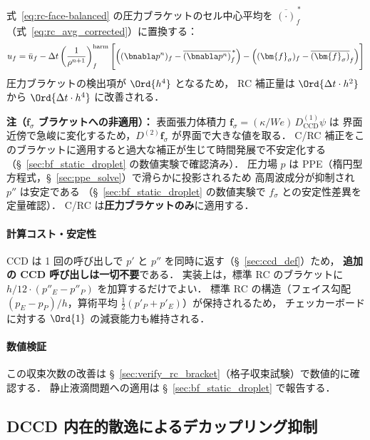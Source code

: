 式~\eqref{eq:rc-face-balanced} の圧力ブラケットのセル中心平均を
$\overline{(\cdot)}_f^{\,*}$（式~\eqref{eq:rc_avg_corrected}）に置換する：
\begin{equation}
  u_f = \bar{u}_f
    - \Delta t\left(\frac{1}{\rho^{n+1}}\right)_f^{\mathrm{harm}}
    \Biggl[
      \Bigl((\bnabla p^n)_f - \overline{(\bnabla p^n)}^{\,*}_f\Bigr)
      - \Bigl((\bm{f}_\sigma)_f - \overline{(\bm{f}_\sigma)}_f\Bigr)
    \Biggr]
  \label{eq:rc-face-balanced-ho}
\end{equation}
圧力ブラケットの検出項が $\Ord{h^4}$ となるため，
RC 補正量は $\Ord{\Delta t \cdot h^2}$ から $\Ord{\Delta t \cdot h^4}$ に改善される．

\medskip
\noindent\textbf{注（$\bm{f}_\sigma$ ブラケットへの非適用）：}
表面張力体積力 $\bm{f}_\sigma = (\kappa/We)\,D^{(1)}_\mathrm{CCD}\psi$ は
界面近傍で急峻に変化するため，$D^{(2)}\bm{f}_\sigma$ が界面で大きな値を取る．
C/RC 補正をこのブラケットに適用すると過大な補正が生じて時間発展で不安定化する
（§~\ref{sec:bf_static_droplet} の数値実験で確認済み）．
圧力場 $p$ は PPE（楕円型方程式，§~\ref{sec:ppe_solve}）で滑らかに投影されるため
高周波成分が抑制され $p''$ は安定である
（§~\ref{sec:bf_static_droplet} の数値実験で $f_\sigma$ との安定性差異を定量確認）．
C/RC は\textbf{圧力ブラケットのみ}に適用する．

\paragraph{計算コスト・安定性}
CCD は 1 回の呼び出しで $p'$ と $p''$ を同時に返す（§~\ref{sec:ccd_def}）ため，
\textbf{追加の CCD 呼び出しは一切不要}である．
実装上は，標準 RC のブラケットに $h/12 \cdot (p''_E - p''_P)$ を加算するだけでよい．
標準 RC の構造（フェイス勾配 $(p_E-p_P)/h$，算術平均 $\frac{1}{2}(p'_P+p'_E)$）が保持されるため，
チェッカーボードに対する $\Ord{1}$ の減衰能力も維持される．

\paragraph{数値検証}
この収束次数の改善は §~\ref{sec:verify_rc_bracket}（格子収束試験）で数値的に確認する．
静止液滴問題への適用は §~\ref{sec:bf_static_droplet} で報告する．

\subsection{DCCD 内在的散逸によるデカップリング抑制}
\label{sec:dccd_decoupling}

